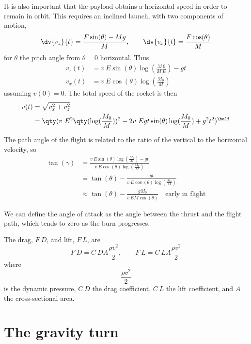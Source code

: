 It is also important that the payload obtains a horizontal speed in
order to remain in orbit. This requires an inclined launch, with two
components of motion,
\[
\dv{v_z}{t} = \frac{F \sin(\theta)-Mg}{M}, \qquad \dv{v_x}{t} = \frac{F \cos(\theta)}{M} 
\]
for $\theta$ the pitch angle from $\theta=0$ horizontal. Thus
\begin{align*}
v_z(t) &= v~E \sin(\theta) \log( \frac{M~0}{M~E} ) - gt \\ v_x(t) &= v~E \cos(\theta) \log(\frac{M_0}{M})
\end{align*}
assuming $v(0)=0$. The total speed of the rocket is then
\begin{align*}
 v(t) &= \sqrt{v^2_x + v^2_z} \\ &= \qty( v~E^2 \qty( \log(\frac{M_0}{M}))^2 - 2 v~E g t \sin(\theta) \log( \frac{M_0}{M}) + g^2 t^2 )^{\half} 
\end{align*}

The path angle of the flight is related to the ratio of the vertical
to the horizontal velocity, so
\begin{align*} \tan(\gamma) &= \frac{v~E \sin(\theta) \log(\frac{M_0}{M})-gt}{v~E \cos(\theta) \log(\frac{M_0}{M})} \\
&= \tan(\theta) - \frac{gt}{v~E \cos(\theta) \log( \frac{M_0}{M})} \\
& \approx \tan(\theta) - \frac{g M_0}{v~E \dot{M} \cos(\theta)} \quad \text{early in flight}
\end{align*}

We can define the angle of attack as the angle between the thrust and
the flight path, which tends to zero as the burn progresses.

The drag, $F~D$, and lift, $F~L$, are
\[ F~D = C~D A \frac{\rho v^2}{2}, \qquad F~L = C~L A \frac{\rho v^2}{2} \]
where 
\[ \frac{\rho v^2}{2} \] is the dynamic pressure, $C~D$ the drag
coefficient, $C~L$ the lift coefficient, and $A$ the cross-sectional
area.


\section{The gravity turn}
\label{sec:gravity-turn}


